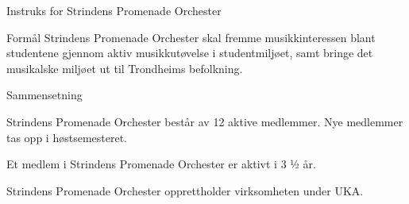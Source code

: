 
\begin{instruks}{Instruks for Strindens Promenade Orchester}
    \begin{instruksledd}{Formål}
Strindens Promenade Orchester skal fremme musikkinteressen blant studentene gjennom aktiv
musikkutøvelse i studentmiljøet, samt bringe det musikalske miljøet ut til Trondheims befolkning.
    \end{instruksledd}
    
    \begin{instruksledd}{Sammensetning}
\begin{numerator}
\item Strindens Promenade Orchester består av 12 aktive medlemmer. Nye medlemmer tas opp i høstsemesteret.
\item Et medlem i Strindens Promenade Orchester er aktivt i 3 ½ år.
\item Strindens Promenade Orchester opprettholder virksomheten under UKA.
\end{numerator}
    \end{instruksledd}


\end{instruks}


